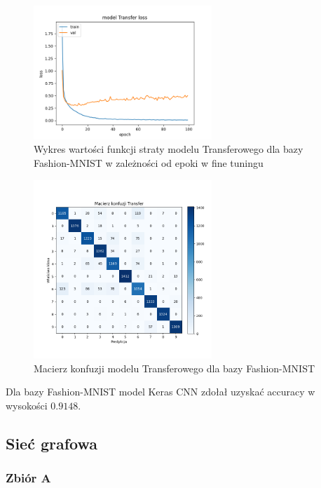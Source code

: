 \documentclass{article}
\begin{document}
\begin{figure}[H]
    \centering
    \includegraphics[width=0.6\textwidth]{../Saves/Transfer/fashion-mnist/Transfer_fashion-mnist_ep100_loss.png}
    \caption{Wykres wartości funkcji straty modelu Transferowego dla bazy Fashion-MNIST w zależności od epoki w fine tuningu} 
\end{figure}

\begin{figure}[H]
	\centering
	\includegraphics[width=0.6\textwidth]{../Saves/Transfer/fashion-mnist/Transfer_fashion-mnist_conf_mat.png}
	\caption{Macierz konfuzji modelu Transferowego dla bazy Fashion-MNIST}
\end{figure}
Dla bazy Fashion-MNIST model Keras CNN zdołał uzyskać accuracy w wysokości $0.9148$.

\subsection{Sieć grafowa}

\subsubsection{Zbiór A}
\end{document}
